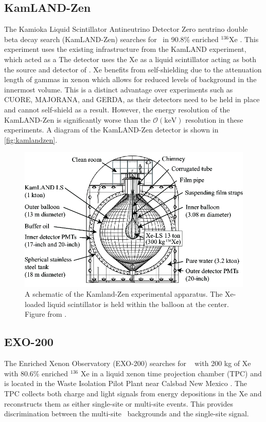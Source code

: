 \subsection{KamLAND-Zen}
The Kamioka Liquid Scintillator Antineutrino Detector Zero neutrino double beta decay search (KamLAND-Zen) searches for \zeronubb~in 90.8\% enriched $^{136}$Xe \cite{KamLAND-Zen:2016pfg}. This experiment uses the existing infrastructure from the KamLAND experiment, which acted as a  The detector uses the Xe as a liquid scintillator acting as both the source and detector of \zeronubb. Xe benefits from self-shielding due to the attenuation length of gammas in xenon which allows for reduced levels of background in the innermost volume. This is a distinct advantage over experiments such as CUORE, MAJORANA, and GERDA, as their detectors need to be held in place and cannot self-shield as a result. However, the energy resolution of the KamLAND-Zen is significantly worse than the $\mathcal{O}(\textrm{keV})$ resolution in these experiments. A diagram of the KamLAND-Zen detector is shown in \autoref{fig:kamlandzen}.

\begin{figure}[tbph]
\centering
\includegraphics[width=0.7\linewidth]{Figures/KamlandZen}
\caption[A schematic of the Kamland-Zen experimental apparatus.]{A schematic of the Kamland-Zen experimental apparatus. The Xe-loaded liquid scintillator is held within the balloon at the center. Figure from \cite{::2015uaa}.}
\label{fig:kamlandzen}
\end{figure}

\subsection{EXO-200}
The Enriched Xenon Observatory (EXO-200) searches for \zeronubb~ with 200 kg of Xe with 80.6\% enriched $^{136}$ Xe in a liquid xenon time projection chamber (TPC) and is located in the Waste Isolation Pilot Plant near Calsbad New Mexico \cite{Albert:2017owj}. The TPC collects both charge and light signals from energy depositions in the Xe and reconstructs them as either single-site or multi-site events. This provides discrimination between the multi-site \gamma~backgrounds and the single-site signal.

